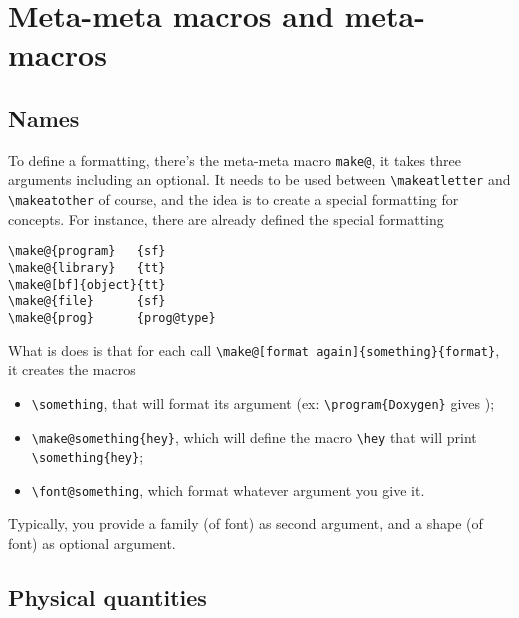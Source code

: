 \documentclass{documentation}
\begin{document}
\section[sec_2]{Meta-meta macros and meta-macros}

\subsection{Names}

To define a formatting, there's the meta-meta macro \verb!make@!, it takes
three arguments including an optional. It needs to be used between
\verb!\makeatletter! and \verb!\makeatother! of course, and the
idea is to create a special formatting for concepts. For instance,
there are already defined the special formatting
\begin{verbatim}
\make@{program}   {sf}
\make@{library}   {tt}
\make@[bf]{object}{tt}
\make@{file}      {sf}
\make@{prog}      {prog@type}
\end{verbatim}

What is does is that for each call \verb!\make@[format again]{something}{format}!, it creates
the macros
\begin{itemize}
\item \verb!\something!, that will format its argument 
        (ex: \verb!\program{Doxygen}! gives );
\item \verb!\make@something{hey}!, which will define the macro \verb!\hey! that
        will print \verb!\something{hey}!;
\item \verb!\font@something!, which format whatever argument you give it.
\end{itemize}
Typically, you provide a family (of font) as second argument, and a shape (of font)
as optional argument.

\subsection{Physical quantities}
\end{document}
